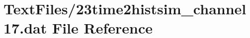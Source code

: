 \hypertarget{23time2histsim__channel17_8dat}{}\section{Text\+Files/23time2histsim\+\_\+channel17.dat File Reference}
\label{23time2histsim__channel17_8dat}
